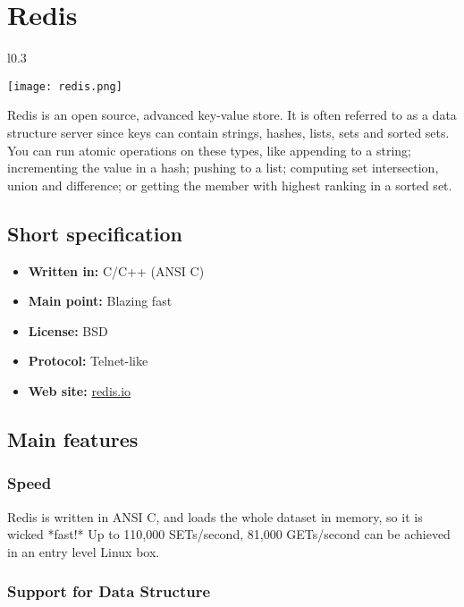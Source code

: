 \chapter{Redis}

\begin{wrapfigure}{l}{0.3\textwidth}
  \vspace{-80pt}
  \begin{center}
    \texttt{[image: redis.png]}
  \end{center}
  \vspace{-20pt}
\end{wrapfigure}
Redis is an open source, advanced key-value store. It is often referred to as a data structure server since keys can contain strings, hashes, lists, sets and sorted sets.
You can run atomic operations on these types, like appending to a string; incrementing the value in a hash; pushing to a list; computing set intersection, union and difference; or getting the member with highest ranking in a sorted set.

\section{Short specification}

\begin{itemize}
  \item \textbf{Written in:} C/C++ (ANSI C)
  \item \textbf{Main point:} Blazing fast
  \item \textbf{License:} BSD
  \item \textbf{Protocol:} Telnet-like
  \item \textbf{Web site:} \href{http://redis.io}{redis.io}
\end{itemize}

\section{Main features}

\subsection{Speed}

Redis is written in ANSI C, and loads the whole dataset in memory, so it is wicked *fast!* Up to 110,000 SETs/second, 81,000 GETs/second can be achieved in an entry level Linux box.

\subsection{Support for Data Structure}

